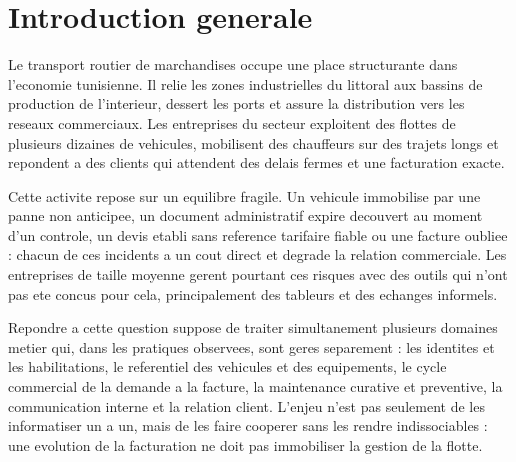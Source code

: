 \cleardoublepage
{}
{}
\chapter*{Introduction generale}

Le transport routier de marchandises occupe une place structurante dans
l'economie tunisienne. Il relie les zones industrielles du littoral aux
bassins de production de l'interieur, dessert les ports et assure la
distribution vers les reseaux commerciaux. Les entreprises du secteur
exploitent des flottes de plusieurs dizaines de vehicules, mobilisent des
chauffeurs sur des trajets longs et repondent a des clients qui attendent
des delais fermes et une facturation exacte.

Cette activite repose sur un equilibre fragile. Un vehicule immobilise
par une panne non anticipee, un document administratif expire decouvert
au moment d'un controle, un devis etabli sans reference tarifaire fiable
ou une facture oubliee : chacun de ces incidents a un cout direct et
degrade la relation commerciale. Les entreprises de taille moyenne
gerent pourtant ces risques avec des outils qui n'ont pas ete concus
pour cela, principalement des tableurs et des echanges informels.

\vspace{0.4cm}
\noindent
{}
\vspace{0.4cm}

Repondre a cette question suppose de traiter simultanement plusieurs
domaines metier qui, dans les pratiques observees, sont geres
separement : les identites et les habilitations, le referentiel des
vehicules et des equipements, le cycle commercial de la demande a la
facture, la maintenance curative et preventive, la communication interne
et la relation client. L'enjeu n'est pas seulement de les informatiser un
a un, mais de les faire cooperer sans les rendre indissociables : une
evolution de la facturation ne doit pas immobiliser la gestion de la
flotte.

